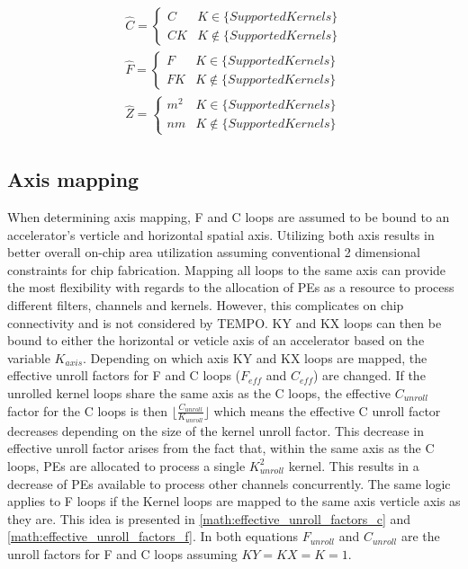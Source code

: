 \begin{align}
    \begin{gathered}
        \hat{C} = \begin{cases} C &  K \in \{SupportedKernels\}\\ CK & K \notin \{SupportedKernels\}\end{cases} \\
        \hat{F} = \begin{cases} F &  K \in \{SupportedKernels\}\\ FK & K \notin \{SupportedKernels\}\end{cases} \\
        \hat{Z} = \begin{cases} m^2 &  K \in \{SupportedKernels\}\\ nm & K \notin \{SupportedKernels\}\end{cases}
            \end{gathered}
    \label{math:layer_equivelence}
\end{align}

\subsection{Axis mapping}
\label{chap:dataflow_dse:exploring:tempo_model:axis_mapping}

When determining axis mapping, F and C loops are assumed to be bound to an
accelerator's verticle and horizontal spatial axis. Utilizing both axis results
in better overall on-chip area utilization assuming conventional 2 dimensional
constraints for chip fabrication. Mapping all loops to the same axis can provide
the most flexibility with regards to the allocation of PEs as a resource to
process different filters, channels and kernels. However, this complicates on
chip connectivity and is not considered by TEMPO. KY and KX loops can then be
bound to either the horizontal or veticle axis of an accelerator based on the
variable $K_{axis}$.  Depending on which axis KY and KX loops are mapped, the
effective unroll factors for F and C loops ($F_{eff}$ and $C_{eff}$) are
changed. If the unrolled kernel loops share the same axis as the C loops, the
effective $C_{unroll}$ factor for the C loops is then $\lfloor
\frac{C_{unroll}}{K_{unroll}} \rfloor$ which means the effective C unroll factor
decreases depending on the size of the kernel unroll factor. This decrease in
effective unroll factor arises from the fact that, within the same axis as the C
loops, \ac{PE}s are allocated to process a single $K^2_{unroll}$ kernel. This
results in a decrease of \ac{PE}s available to process other channels
concurrently. The same logic applies to F loops if the Kernel loops are mapped
to the same axis verticle axis as they are. This idea is presented in
\autoref{math:effective_unroll_factors_c} and
\autoref{math:effective_unroll_factors_f}. In both equations $F_{unroll}$ and
$C_{unroll}$ are the unroll factors for F and C loops assuming $KY=KX=K=1$.


